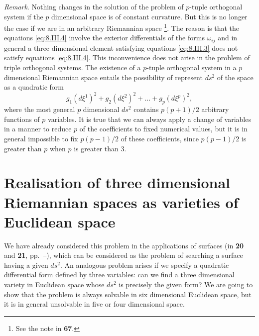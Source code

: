 \documentclass[leqno,11pt]{book}
\numberwithin{equation}{chapter}
\theoremstyle{shape1}
\theoremstyle{shape0}
\theoremstyle{shape2}
\theoremstyle{definition}
\begin{document}
\vspace{12pt}\fsec\emph{Remark}. Nothing changes in the solution of the problem of $p$-tuple orthogonal system if the $p$ dimensional space is of constant curvature. But this is no longer the case if we are in an arbitrary Riemannian space \footnote{See the note in \textsection\textbf{67}.}. The reason is that the equations \eqref{eq:8.III.4} involve the exterior differentials of the forms $\omega_{ij}$ and in general a three dimensional element satisfying equations \eqref{eq:8.III.3} does not satisfy equations \eqref{eq:8.III.4}. This inconvenience does not arise in the problem of triple orthogonal systems. The existence of a $p$-tuple orthogonal system in a $p$ dimensional Riemannian space entails the possibility of represent $ds^{2}$ of the space as a quadratic form
\[
g_{1}(d\xi^{1})^{2}+g_{2}(d\xi^{2})^{2}+\dots+g_{p}(d\xi^{p})^{2},
\]
where the most general $p$ dimensional $ds^{2}$ contains $p(p+1)/2$ arbitrary functions of $p$ variables. It is true that we can always apply a change of variables in a manner to reduce $p$ of the coefficients to fixed numerical values, but it is in general impossible to fix $p(p-1)/2$ of these coefficients, since $p(p-1)/2$ is greater than $p$ when $p$ is greater than $3$.


\section{Realisation of three dimensional Riemannian spaces as varieties of Euclidean space}
\label{sec:real-riem-space}

\fsec We have already considered this problem in the applications of surfaces  (in \textsection\textbf{20} and \textsection\textbf{21}, pp.~\pageref{s20}--\pageref{s21}), which can be considered as the problem of searching a surface having a given $ds^{2}$. An analogous problem arises if we specify a quadratic differential form defined  by three variables: can we find a three dimensional variety in Euclidean space whose $ds^{2}$ is precisely the given form? We are going to show that the problem is always solvable in six dimensional Euclidean space, but it is in general unsolvable in five or four dimensional space.
\end{document}
